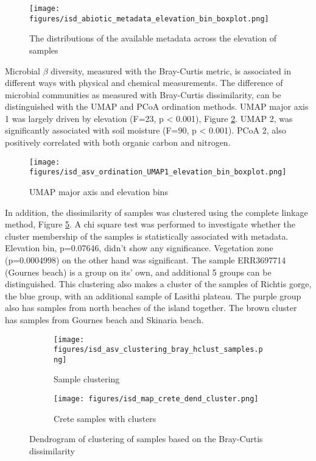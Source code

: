 \begin{figure}[hbt!]
      \centering
      \texttt{[image: figures/isd\_abiotic\_metadata\_elevation\_bin\_boxplot.png]}
      \caption[Elevation and metadata distributions]{The distributions of the available metadata across the elevation of samples}
      \label{fig:isd_elevation_metadata}
\end{figure}

Microbial $\beta$ diversity, measured with the Bray-Curtis metric, is associated in different ways with physical and chemical
measurements. The difference of microbial communities as measured with Bray-Curtis dissimilarity, can be distinguished with 
the UMAP and PCoA ordination methods. UMAP major axis 1 was largely driven by
elevation (F=23, p < 0.001), Figure \ref{fig:isd_elevation_umap1}. 
UMAP 2, was significantly associated with soil moisture (F=90, p < 0.001).
PCoA 2,  also positively correlated with both organic carbon and nitrogen.

\begin{figure}[hbt!]
      \centering
      \texttt{[image: figures/isd\_asv\_ordination\_UMAP1\_elevation\_bin\_boxplot.png]}
      \caption[Elevation and UMAP1]{UMAP major axis and elevation bins}
      \label{fig:isd_elevation_umap1}
\end{figure}

In addition, the dissimilarity of samples was clustered using the complete linkage method, Figure \ref{fig:isd_samples_dendro}. 
A chi square test was performed to investigate whether the cluster membership of the samples
is statistically associated with metadata. Elevation bin, p=0.07646, didn't show any 
significance. Vegetation zone (p=0.0004998) on the other hand was significant.
The sample ERR3697714 (Gournes beach) is a group on its' own, and additional 5 groups can be distinguished. 
This clustering also makes a cluster of the samples of Richtis gorge, the blue group, with an additional sample
of Lasithi plateau. The purple group also has samples from north beaches of the island together.
The brown cluster has samples from Gournes beach and Skinaria beach.

\begin{figure}[!hbt]
    \centering
    \begin{subfigure}[b]{0.8\textwidth}
        \centering
        \texttt{[image: figures/isd\_asv\_clustering\_bray\_hclust\_samples.png]}
        \caption{Sample clustering}
        \label{fig:dendro}
    \end{subfigure}
    \vspace{1cm} %
    \begin{subfigure}[b]{0.8\textwidth}
        \centering
        \texttt{[image: figures/isd\_map\_crete\_dend\_cluster.png]}
        \caption{Crete samples with clusters}
        \label{fig:crete_dendro}
    \end{subfigure}
    \caption[Samples dendrogram]{Dendrogram of clustering of samples based on the Bray-Curtis dissimilarity}
    \label{fig:isd_samples_dendro}
\end{figure}

